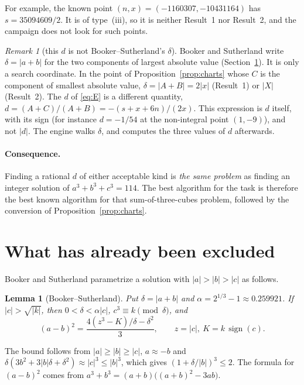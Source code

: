 \documentclass[11pt,a4paper]{article}
\newtheorem{lemma}[proposition]{Lemma}
\theoremstyle{remark}
\newtheorem{remark}[proposition]{Remark}
\newcommand{\code}[1]{\path{#1}}
\newcommand{\sgn}{\operatorname{sign}}
\begin{document}
\noindent For example, the known point $(n,x)=(-1160307,-10431164)$ has $s=35094609/2$. It is
of type~(iii), so it is neither Result~1 nor Result~2, and the campaign does not look for such
points.

\begin{remark}[this $d$ is not Booker--Sutherland's $\delta$]\label{rem:delta}
Booker and Sutherland write $\delta=|a+b|$ for the two components of largest absolute value
(Section~\ref{sec:excluded}). It is only a search coordinate. In the point of
Proposition~\ref{prop:charts} whose $C$ is the component of smallest absolute value,
$\delta=|A+B|=2|x|$ (Result~1) or $|X|$ (Result~2). The $d$ of \eqref{eq:E} is a different
quantity, $d=(A+C)/(A+B)=-(s+x+6n)/(2x)$. This expression is $d$ itself, with its sign (for
instance $d=-1/54$ at the non-integral point $(1,-9)$), and not $|d|$. The engine walks
$\delta$, and \code{to_d.py} computes the three values of $d$ afterwards.
\end{remark}

\paragraph{Consequence.} Finding a rational $d$ of either acceptable kind is \emph{the same
problem} as finding an integer solution of $a^3+b^3+c^3=114$. The best algorithm for the
task is therefore the best known algorithm for that sum-of-three-cubes problem, followed by
the conversion of Proposition~\ref{prop:charts}.

\section{What has already been excluded}\label{sec:excluded}

Booker and Sutherland \cite{BS} parametrize a solution with $|a|>|b|>|c|$ as follows.

\begin{lemma}[Booker--Sutherland]\label{lem:bs}
Put $\delta=|a+b|$ and $\alpha=2^{1/3}-1\approx0.259921$. If $|c|>\sqrt{|k|}$, then
$0<\delta<\alpha|c|$, $c^3\equiv k\pmod\delta$, and
\[
  (a-b)^2=\frac{4(z^3-K)/\delta-\delta^2}{3},\qquad z=|c|,\ K=k\,\sgn(c).
\]
\end{lemma}
\noindent The bound follows from $|a|\ge|b|\ge|c|$, $a\approx-b$ and
$\delta(3b^2+3|b|\delta+\delta^2)\approx|c|^3\le|b|^3$, which gives
$(1+\delta/|b|)^3\le2$. The formula for $(a-b)^2$ comes from
$a^3+b^3=(a+b)\bigl((a+b)^2-3ab\bigr)$.
\end{document}
